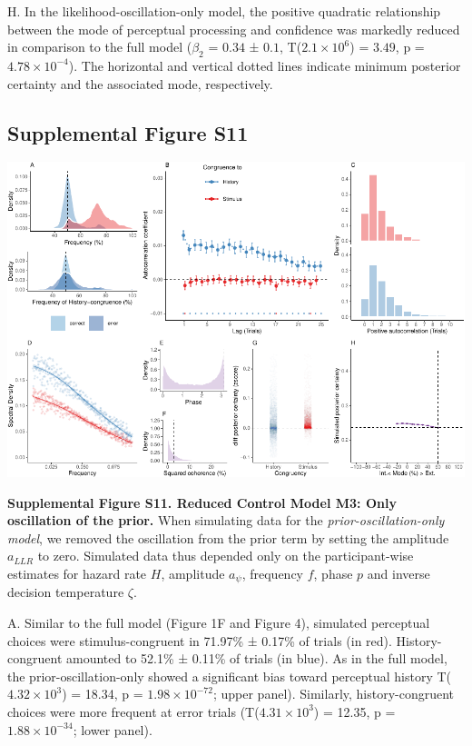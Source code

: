 \documentclass[
]{article}
\begin{document}
H. In the likelihood-oscillation-only model, the positive quadratic
relationship between the mode of perceptual processing and confidence
was markedly reduced in comparison to the full model (\(\beta_2\) =
\(0.34\) ± \(0.1\), T(\(\ensuremath{2.1\times 10^{6}}\)) = \(3.49\), p =
\(\ensuremath{4.78\times 10^{-4}}\)). The horizontal and vertical dotted
lines indicate minimum posterior certainty and the associated mode,
respectively.

\newpage

\hypertarget{supplemental-figure-s11}{%
\subsection{Supplemental Figure S11}\label{supplemental-figure-s11}}

\includegraphics{modes_mouse_rev2_files/figure-latex/Supplemental_Figure_S11-1.pdf}

\textbf{Supplemental Figure S11. Reduced Control Model M3: Only
oscillation of the prior.} When simulating data for the
\emph{prior-oscillation-only model}, we removed the oscillation from the
prior term by setting the amplitude \(a_{LLR}\) to zero. Simulated data
thus depended only on the participant-wise estimates for hazard rate
\(H\), amplitude \(a_{\psi}\), frequency \(f\), phase \(p\) and inverse
decision temperature \(\zeta\).

A. Similar to the full model (Figure 1F and Figure 4), simulated
perceptual choices were stimulus-congruent in 71.97\% ± 0.17\% of trials
(in red). History-congruent amounted to 52.1\% ± 0.11\% of trials (in
blue). As in the full model, the prior-oscillation-only showed a
significant bias toward perceptual history
T(\ensuremath{4.32\times 10^{3}}) = 18.34, p =
\(\ensuremath{1.98\times 10^{-72}}\); upper panel). Similarly,
history-congruent choices were more frequent at error trials
(T(\ensuremath{4.31\times 10^{3}}) = 12.35, p =
\(\ensuremath{1.88\times 10^{-34}}\); lower panel).
\end{document}
